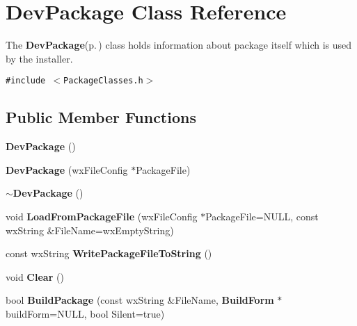 \section{Dev\-Package Class Reference}
\label{class_dev_package}
The {\bf Dev\-Package}{\rm (p.\,\pageref{class_dev_package})} class holds information about package itself which is used by the installer.  


{\tt \#include $<$Package\-Classes.h$>$}

\subsection*{Public Member Functions}
\begin{CompactItemize}
\item 
{\bf Dev\-Package} ()
\item 
{\bf Dev\-Package} (wx\-File\-Config $\ast$Package\-File)
\item 
{\bf $\sim$Dev\-Package} ()
\item 
void {\bf Load\-From\-Package\-File} (wx\-File\-Config $\ast$Package\-File=NULL, const wx\-String \&File\-Name=wx\-Empty\-String)
\item 
const wx\-String {\bf Write\-Package\-File\-To\-String} ()
\item 
void {\bf Clear} ()
\item 
bool {\bf Build\-Package} (const wx\-String \&File\-Name, {\bf Build\-Form} $\ast$build\-Form=NULL, bool Silent=true)
\end{CompactItemize}
